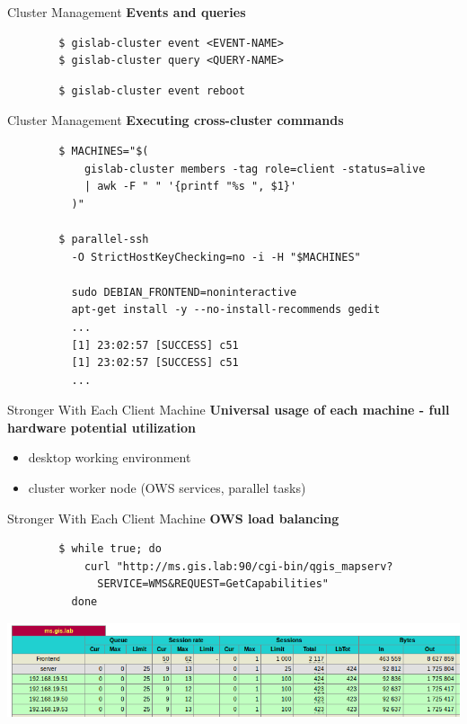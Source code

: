 \documentclass[12pt]{beamer}
\begin{document}
\begin{frame}[fragile]{Cluster Management}
	\textbf{Events and queries}

	\lstset{language=sh}
	\begin{lstlisting}
		$ gislab-cluster event <EVENT-NAME>
		$ gislab-cluster query <QUERY-NAME>		
	\end{lstlisting}

	\lstset{language=sh}
	\begin{lstlisting}
		$ gislab-cluster event reboot
	\end{lstlisting}
\end{frame}

\begin{frame}[fragile]{Cluster Management}
	\textbf{Executing cross-cluster commands}

	\lstset{language=sh}
	\begin{lstlisting}
		$ MACHINES="$(
		    gislab-cluster members -tag role=client -status=alive
		    | awk -F " " '{printf "%s ", $1}'
		  )"

		$ parallel-ssh
		  -O StrictHostKeyChecking=no -i -H "$MACHINES"

		  sudo DEBIAN_FRONTEND=noninteractive
		  apt-get install -y --no-install-recommends gedit
		  ...
		  [1] 23:02:57 [SUCCESS] c51
		  [1] 23:02:57 [SUCCESS] c51
		  ...
	\end{lstlisting}
\end{frame}

\begin{frame}{Stronger With Each Client Machine}
	\textbf{Universal usage of each machine - full hardware potential utilization}
	\begin{itemize}
		\item desktop working environment
		\item cluster worker node (OWS services, parallel tasks)
	\end{itemize}
\end{frame}

\begin{frame}[fragile]{Stronger With Each Client Machine}
	\textbf{OWS load balancing}

	\lstset{language=sh}
	\begin{lstlisting}
		$ while true; do
		    curl "http://ms.gis.lab:90/cgi-bin/qgis_mapserv?
		      SERVICE=WMS&REQUEST=GetCapabilities"
		  done
	\end{lstlisting}
	\begin{center}
		\includegraphics[keepaspectratio=true,width=\textwidth]{images/haproxy-stats.png}
	\end{center}
\end{frame}
\end{document}
